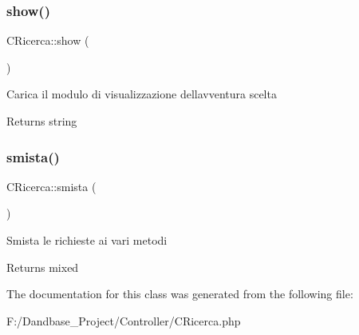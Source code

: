 \subsubsection{\texorpdfstring{show()}{show()}}
{\footnotesize\ttfamily C\+Ricerca\+::show (\begin{DoxyParamCaption}{ }\end{DoxyParamCaption})}

Carica il modulo di visualizzazione dell\textquotesingle{}avventura scelta

\begin{DoxyReturn}{Returns}
string 
\end{DoxyReturn}
\mbox{\label{class_c_ricerca_ac96d19e55d037f65635a90579c76c84c}} 
\subsubsection{\texorpdfstring{smista()}{smista()}}
{\footnotesize\ttfamily C\+Ricerca\+::smista (\begin{DoxyParamCaption}{ }\end{DoxyParamCaption})}

Smista le richieste ai vari metodi

\begin{DoxyReturn}{Returns}
mixed 
\end{DoxyReturn}


The documentation for this class was generated from the following file\+:\begin{DoxyCompactItemize}
\item 
F\+:/\+Dandbase\+\_\+\+Project/\+Controller/C\+Ricerca.\+php\end{DoxyCompactItemize}
